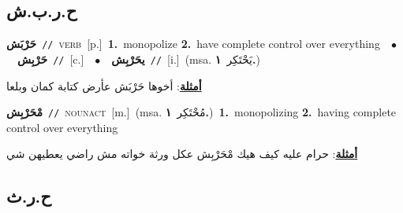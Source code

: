 \documentclass[10pt,a4paper,twoside]{article} %
\begin{document}
\begin{multicols}{2}
\vspace{-3mm}
\subsection*{\color{blue}\foreignlanguage{arabic}{ح.ر.ب.ش}\color{blue}{}} 

{\setlength\topsep{0pt}\textbf{\foreignlanguage{arabic}{حَرْبَش}}\ {\color{gray}\texttt{//}\color{black}}\ \textsc{verb}\ [p.]\ \textbf{1.}~monopolize  \textbf{2.}~have complete control over everything\ \ $\bullet$\ \ \setlength\topsep{0pt}\textbf{\foreignlanguage{arabic}{حَرْبِش}}\ {\color{gray}\texttt{//}\color{black}}\ [c.]\ \ $\bullet$\ \ \setlength\topsep{0pt}\textbf{\foreignlanguage{arabic}{يحَرْبِش}}\ {\color{gray}\texttt{//}\color{black}}\ [i.]\ \color{gray}(msa. \foreignlanguage{arabic}{يَحْتَكِر}~\foreignlanguage{arabic}{\textbf{١.}})\color{black}\  \begin{flushright}\color{gray}\foreignlanguage{arabic}{\textbf{\underline{\foreignlanguage{arabic}{أمثلة}}}: أخوها حَرْبَش عأرض كتابة كمان وبلعا}\end{flushright}\color{black}} \vspace{2mm}

{\setlength\topsep{0pt}\textbf{\foreignlanguage{arabic}{مْحَرْبِش}}\ {\color{gray}\texttt{//}\color{black}}\ \textsc{noun\textunderscore act}\ [m.]\ \color{gray}(msa. \foreignlanguage{arabic}{مُحْتَكِر}~\foreignlanguage{arabic}{\textbf{١.}})\color{black}\ \textbf{1.}~monopolizing  \textbf{2.}~having complete control over everything\  \begin{flushright}\color{gray}\foreignlanguage{arabic}{\textbf{\underline{\foreignlanguage{arabic}{أمثلة}}}: حرام عليه كيف هيك مْحَرْبِش عكل ورثة خواته مش راضي يعطيهن شي}\end{flushright}\color{black}} \vspace{2mm}

\vspace{-3mm}
\subsection*{\color{blue}\foreignlanguage{arabic}{ح.ر.ث}\color{blue}{}} 


\end{multicols}
\end{document}
